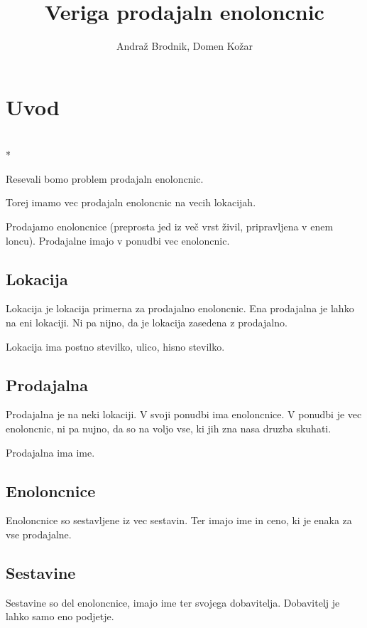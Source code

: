 \documentclass[12pt]{article}
\title{Veriga prodajaln enoloncnic}
\author{Andraž Brodnik, Domen Kožar}
\let\stdsection\section
\renewcommand\section{\newpage\stdsection}
\begin{document}
\maketitle

\tableofcontents


\section{Uvod}

\\*

Resevali bomo problem prodajaln enoloncnic. 

Torej imamo vec prodajaln enoloncnic na vecih lokacijah.

Prodajamo enoloncnice (preprosta jed iz več vrst živil, pripravljena v enem loncu). Prodajalne imajo v ponudbi vec enoloncnic.

\subsection{Lokacija}

Lokacija je lokacija primerna za prodajalno enoloncnic. Ena prodajalna je lahko na eni lokaciji. 
Ni pa nijno, da je lokacija zasedena z prodajalno.

Lokacija ima postno stevilko, ulico, hisno stevilko.

\subsection{Prodajalna}

Prodajalna je na neki lokaciji. V svoji ponudbi ima enoloncnice. V ponudbi je vec enoloncnic, ni pa nujno, da so na voljo vse, ki jih zna nasa druzba skuhati.

Prodajalna ima ime.

\subsection{Enoloncnice}

Enoloncnice so sestavljene iz vec sestavin. Ter imajo ime in ceno, ki je enaka za vse prodajalne.


\subsection{Sestavine}

Sestavine so del enoloncnice, imajo ime ter svojega dobavitelja. Dobavitelj je lahko samo eno podjetje.
\end{document}
